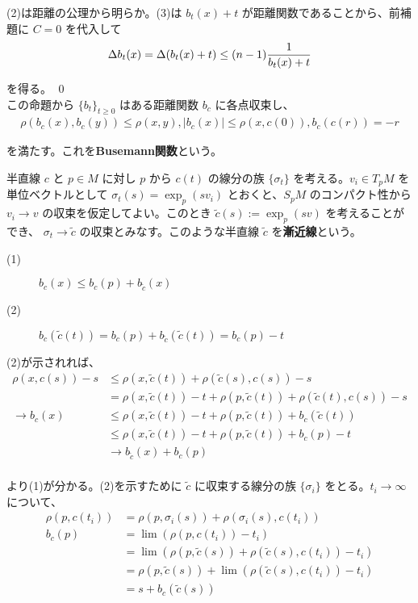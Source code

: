 \documentclass[dvipdfmx,a4paper]{jsreport}
\theoremstyle{definition}
\renewcommand{\tilde}{\widetilde}
\begin{document}
(2)は距離の公理から明らか。(3)は $b_t(x)+t$ が距離関数であることから、前補題に $C=0$ を代入して
\begin{align*}
    \Delta b_t(x) =\Delta(b_t(x)+t) \leq (n-1){1 \over b_t(x)+t}
\end{align*}

を得る。 \qed \\

この命題から $\{b_t\}_{t \geq 0}$ はある距離関数 $b_c$ に各点収束し、
\begin{align*}
    \rho(b_c(x),b_c(y)) \leq \rho(x,y),|b_c(x)| \leq \rho(x,c(0)),b_c(c(r))=-r
\end{align*}

を満たす。これを\textbf{Busemann関数}という。

半直線 $c$ と $p\in M$ に対し $p$ から $c(t)$ の線分の族 $\{\sigma_t\}$ を考える。$v_i \in T_pM$ を単位ベクトルとして $\sigma_t(s)=\exp_p(sv_i)$ とおくと、$S_pM$ のコンパクト性から $v_i \to v$ の収束を仮定してよい。このとき $\tilde{c}(s):=\exp_p(sv)$ を考えることができ、 $\sigma_t \to \tilde{c}$ の収束とみなす。このような半直線 $\tilde{c}$ を\textbf{漸近線}という。

\prop 
\begin{description}
    \item[(1)]$b_c(x) \leq b_c(p)+b_{\tilde{c}}(x)$
    \item[(2)]$b_c(\tilde{c}(t))=b_c(p)+b_{\tilde{c}}(\tilde{c}(t))=b_c(p)-t$
\end{description}

\prf (2)が示されれば、
\begin{align*}
    \rho(x,c(s))-s &\leq \rho(x,\tilde{c}(t))+\rho(\tilde{c}(s),c(s))-s \\
    &= \rho(x,\tilde{c}(t))-t+\rho(p,\tilde{c}(t))+\rho(\tilde{c}(t),c(s))-s \\
    \to b_c(x) &\leq  \rho(x,\tilde{c}(t))-t+\rho(p,\tilde{c}(t))+b_c(\tilde{c}(t)) \\
    &\leq \rho(x,\tilde{c}(t))-t+\rho(p,\tilde{c}(t))+b_c(p)-t \\
    &\to b_{\tilde{c}}(x)+b_c(p) \\
\end{align*}

より(1)が分かる。(2)を示すために $\tilde{c}$ に収束する線分の族 $\{\sigma_i\}$ をとる。$t_i \to \infty$ について、
\begin{align*}
    \rho(p,c(t_i)) &=\rho(p,\sigma_i(s))+\rho(\sigma_i(s),c(t_i)) \\
    b_c(p) &= \lim (\rho(p,c(t_i))-t_i) \\
    &= \lim (\rho(p,\tilde{c}(s))+\rho(\tilde{c}(s),c(t_i))-t_i) \\
    &= \rho(p,\tilde{c}(s))+\lim (\rho(\tilde{c}(s),c(t_i))-t_i) \\
    &= s+b_c(\tilde{c}(s))
\end{align*}
\end{document}
